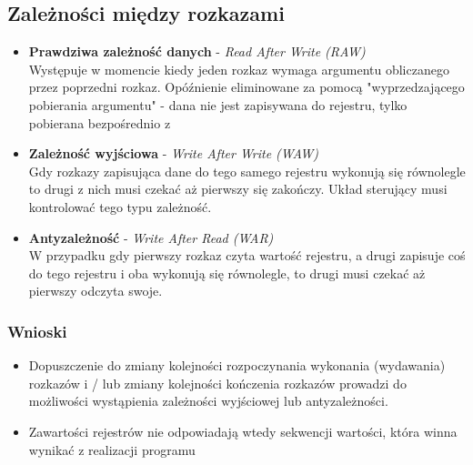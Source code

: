 \documentclass[a4paper,twoside]{article}
\begin{document}
        \subsection*{Zależności między rozkazami}
        	\begin{itemize}
	            \item \textbf{Prawdziwa zależność danych} - \emph{Read After Write (RAW)}\\
	            Występuje w momencie kiedy jeden rozkaz wymaga argumentu obliczanego przez poprzedni rozkaz. Opóźnienie eliminowane za pomocą "wyprzedzającego pobierania argumentu" - dana nie jest zapisywana do rejestru, tylko pobierana bezpośrednio z 
	            \item \textbf{Zależność wyjściowa} - \emph{Write After Write (WAW)}\\
	            Gdy rozkazy zapisująca dane do tego samego rejestru wykonują się równolegle to drugi z nich musi czekać aż pierwszy się zakończy. Układ sterujący musi kontrolować tego typu zależność.
	            \item \textbf{Antyzależność} - \emph{Write After Read (WAR)}\\
	            W przypadku gdy pierwszy rozkaz czyta wartość rejestru, a drugi zapisuje coś do tego rejestru i oba wykonują się równolegle, to drugi musi czekać aż pierwszy odczyta swoje.
            \end{itemize}
            \subsubsection*{Wnioski}
            \begin{itemize}
            	\item Dopuszczenie do zmiany kolejności rozpoczynania wykonania (wydawania) rozkazów i / lub zmiany kolejności kończenia rozkazów prowadzi do możliwości wystąpienia zależności wyjściowej lub antyzależności.
            	\item Zawartości rejestrów nie odpowiadają wtedy sekwencji wartości, która winna wynikać z realizacji programu
            \end{itemize}
            
\end{document}
